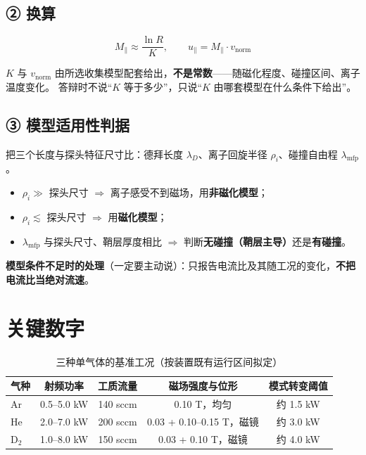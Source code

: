 \documentclass[11pt,a4paper]{ctexart}
\newcommand{\key}[1]{\textbf{\color{accent}#1}}
\begin{document}
\subsection*{② 换算}

\begin{equation}
M_\parallel \approx \frac{\ln R}{K},\qquad u_\parallel = M_\parallel\cdot v_{\mathrm{norm}}
\end{equation}

$K$ 与 $v_{\mathrm{norm}}$ 由所选收集模型配套给出，\key{不是常数}——随磁化程度、碰撞区间、离子温度变化。
答辩时不说“$K$ 等于多少”，只说“$K$ 由哪套模型在什么条件下给出”。

\subsection*{③ 模型适用性判据}

把三个长度与探头特征尺寸比：德拜长度 $\lambda_D$、离子回旋半径 $\rho_i$、碰撞自由程 $\lambda_{\mathrm{mfp}}$。

\begin{itemize}[leftmargin=1.6em,itemsep=1pt]
\item $\rho_i \gg$ 探头尺寸 $\Rightarrow$ 离子感受不到磁场，用\key{非磁化模型}；
\item $\rho_i \lesssim$ 探头尺寸 $\Rightarrow$ 用\key{磁化模型}；
\item $\lambda_{\mathrm{mfp}}$ 与探头尺寸、鞘层厚度相比 $\Rightarrow$ 判断\key{无碰撞（鞘层主导）}还是\key{有碰撞}。
\end{itemize}

\textbf{模型条件不足时的处理}（一定要主动说）：只报告电流比及其随工况的变化，\key{不把电流比当绝对流速}。

\section{关键数字}

\begin{table}[h]
\centering\small
\caption{三种单气体的基准工况（按装置既有运行区间拟定）}
\begin{tabular}{@{}lcccc@{}}
\toprule
气种 & 射频功率 & 工质流量 & 磁场强度与位形 & 模式转变阈值 \\
\midrule
Ar & 0.5--5.0 kW & 140 sccm & 0.10 T，均匀 & 约 1.5 kW \\
He & 2.0--7.0 kW & 200 sccm & 0.03 + 0.10--0.15 T，磁镜 & 约 3.0 kW \\
D$_2$ & 1.0--8.0 kW & 150 sccm & 0.03 + 0.10 T，磁镜 & 约 4.0 kW \\
\bottomrule
\end{tabular}
\end{table}
\end{document}
